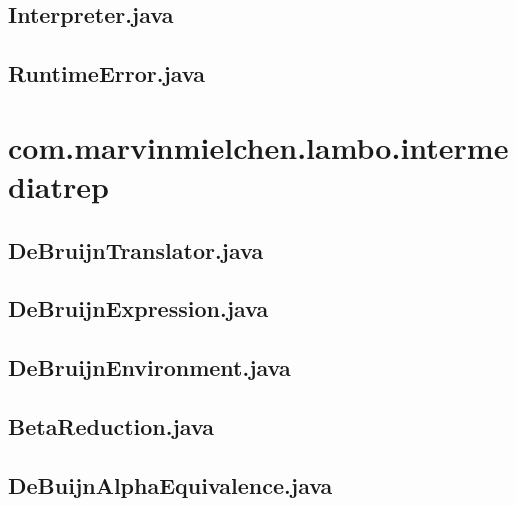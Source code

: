 \documentclass{article}
\begin{document}
\subsection{Interpreter.java}


\subsection{RuntimeError.java}


\section{com.marvinmielchen.lambo.intermediatrep}

\subsection{DeBruijnTranslator.java}


\subsection{DeBruijnExpression.java}


\subsection{DeBruijnEnvironment.java}


\subsection{BetaReduction.java}


\subsection{DeBuijnAlphaEquivalence.java}

\end{document}
